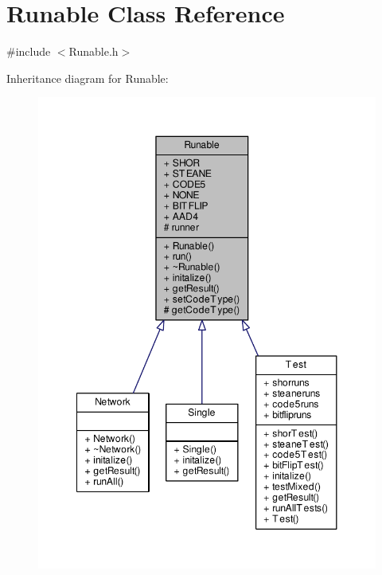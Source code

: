 \hypertarget{class_runable}{}\section{Runable Class Reference}
\label{class_runable}


{\ttfamily \#include $<$Runable.\+h$>$}



Inheritance diagram for Runable\+:\nopagebreak
\begin{figure}[H]
\begin{center}
\leavevmode
\includegraphics[width=348pt]{class_runable__inherit__graph}
\end{center}
\end{figure}

